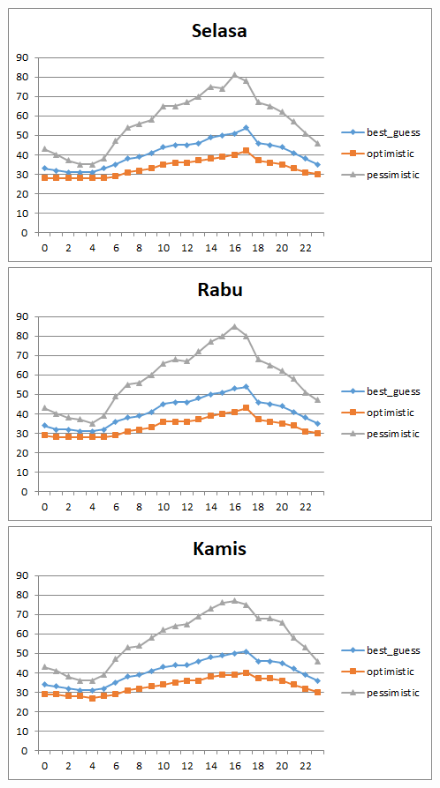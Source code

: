 \begin{figure}[H]
				\centering		
				\includegraphics[]{Gambar/selasasampel124072017normal.png}
				\includegraphics[]{Gambar/rabusampel124072017normal.png}
				\includegraphics[]{Gambar/kamissampel124072017normal.png}
\end{figure}			
			
